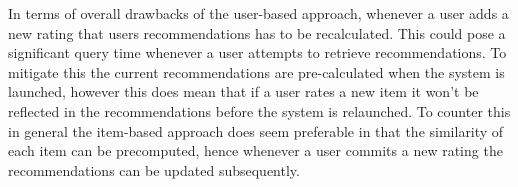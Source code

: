 In terms of overall drawbacks of the user-based approach, whenever a user adds a new rating that users recommendations has to be recalculated. This could pose a significant query time whenever a user attempts to retrieve recommendations. To mitigate this the current recommendations are pre-calculated when the system is launched, however this does mean that if a user rates a new item it won't be reflected in the recommendations before the system is relaunched. To counter this in general the item-based approach does seem preferable in that the similarity of each item can be precomputed, hence whenever a user commits a new rating the recommendations can be updated subsequently.